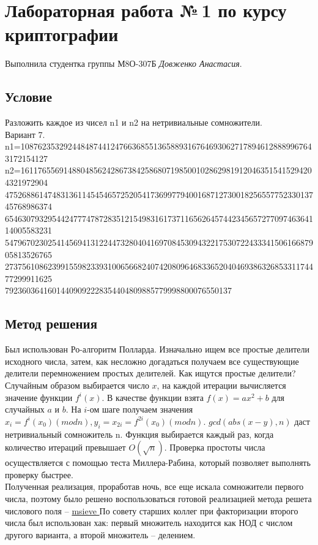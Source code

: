\documentclass[12pt]{article}
\begin{document}
\section*{Лабораторная работа №\,1 по курсу криптографии}

Выполнила студентка группы М8О-307Б \textit{Довженко Анастасия}.

\subsection*{Условие}
Разложить каждое из чисел n1 и n2 на нетривиальные сомножители.\\
Вариант 7.\\
n1=108762353292448487441247663685513658893167646930627178946128889967643172154127
n2=161176556914880485624286738425868071985001028629819120463515415294204321972904\\
47526886147483136114545465725205417369977940016871273001825655775233013745768986374\\
65463079329544247774787283512154983161737116562645744234565727709746364114005583231\\
54796702302541456941312244732804041697084530943221753072243334150616687905813526765\\
27375610862399155982339310065668240742080964683365204046938632685331174477299911625\\
79236036416014409092228354404809885779998800076550137

\subsection*{Метод решения}

Был использован Ро-алгоритм Полларда. Изначально ищем все простые делители исходного числа, затем, как несложно догадаться получаем все существующие делители перемножением простых делителей. Как ищутся простые делители? Случайным образом выбирается число $x$, на каждой итерации вычисляется значение функции $f^{i}(x)$. В качестве функции взята $f(x)= ax^{2} + b$ для случайных $a$ и $b$. На $i$-ом шаге получаем значения $x_{i} = f^{i}(x_{0}) (mod n), y_{i} = x_{2i} = f^{2i}(x_{0}) (mod n)$. $gcd(abs(x - y), n)$ даст нетривиальный сомножитель n. Функция выбирается каждый раз, когда количество итераций превышает $O(\sqrt{n})$. Проверка простоты числа осуществляется с помощью теста Миллера-Рабина, который позволяет выполнять проверку быстрее.\\

Полученная реализация, проработав ночь, все еще искала сомножители первого числа, поэтому было решено воспользоваться готовой реализацией метода решета числового поля -- \href{https://github.com/radii/msieve}{msieve
}
По совету старших коллег при факторизации второго числа был использован хак: первый множитель находится как НОД с числом другого варианта, а второй множитель -- делением. 
\end{document}
